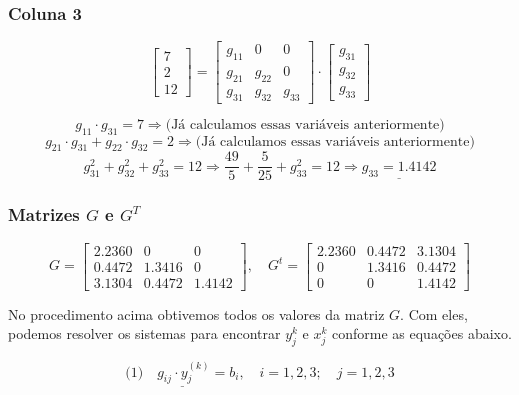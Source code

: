 \documentclass[12pt,a4paper]{article}
\begin{document}
\subsubsection{Coluna 3}

\[
\begin{bmatrix}
7 \\
2 \\
12
\end{bmatrix}
=
\begin{bmatrix}
g_{11} & 0 & 0 \\
g_{21} & g_{22} & 0 \\
g_{31} & g_{32} & g_{33}
\end{bmatrix}
\cdot
\begin{bmatrix}
g_{31} \\
g_{32} \\
g_{33}
\end{bmatrix}
\]

\[
g_{11} \cdot g_{31} = 7 \Rightarrow \text{(Já calculamos essas variáveis anteriormente)}
\]
\[
g_{21} \cdot g_{31} + g_{22} \cdot g_{32} = 2 \Rightarrow \text{(Já calculamos essas variáveis anteriormente)}
\]
\[
g_{31}^2 + g_{32}^2 + g_{33}^2 = 12 \Rightarrow \frac{49}{5} + \frac{5}{25} + g_{33}^2 = 12 \Rightarrow \underline {g_{33} = 1.4142}
\]

\subsubsection{Matrizes \( G \) e \( G^T \)}

\[
G =
\begin{bmatrix}
2.2360 & 0 & 0 \\
0.4472 & 1.3416 & 0 \\
3.1304 & 0.4472 & 1.4142
\end{bmatrix}, \quad
G^t =
\begin{bmatrix}
2.2360 & 0.4472 & 3.1304 \\
0 & 1.3416 & 0.4472 \\
0 & 0 & 1.4142
\end{bmatrix}
\]

\vspace{3em}

\noindent No procedimento acima obtivemos todos os valores da matriz \( G \). Com eles, podemos resolver os sistemas para encontrar \( y_j^k \) e \( x_j^k \) conforme as equações abaixo.

\[
\underline{\text{(1)} \quad g_{ij} \cdot y_j^{(k)} = b_i}, \quad i = 1, 2, 3; \quad j = 1, 2, 3
\]
\end{document}
